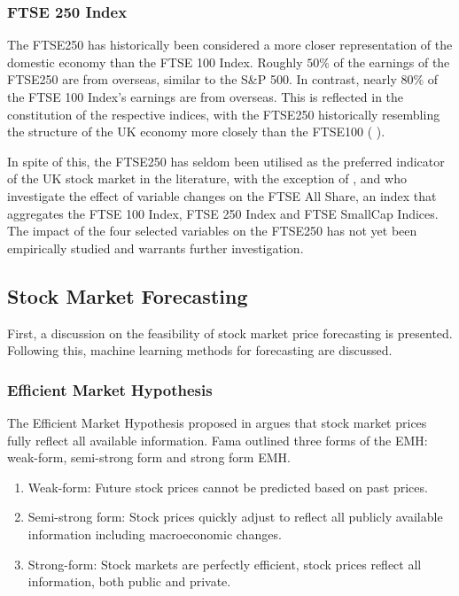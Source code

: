 \documentclass[11pt,a4paper]{article}
\newcommand{\citeboth}[1]{\citeauthor{#1} \citep{#1}}
\begin{document}
\subsubsection{FTSE 250 Index}

The FTSE250 has historically been considered a more closer representation of the domestic economy than the FTSE 100 Index. Roughly $50\%$ of the earnings of the FTSE250 are from overseas, similar to the S\&P 500. In contrast, nearly $80\%$ of the FTSE 100 Index's earnings are from overseas. 
This is reflected in the constitution of the respective indices, with the 
FTSE250 historically resembling the structure of the UK economy more closely than the FTSE100 (\citeboth{ftse250history}).

In spite of this, the FTSE250 has seldom been utilised as the preferred indicator of the UK stock market in the literature,
with the exception of \citeboth{smit2023longrun}, \citeboth{khatri2024impact} and \citeboth{engstrom2006impact} who investigate the effect of variable changes on the FTSE All Share, an index that aggregates the 
FTSE 100 Index, FTSE 250 Index and FTSE SmallCap Indices. The impact of the four selected variables on the FTSE250 has not yet been empirically studied and 
warrants further investigation.

\subsection{Stock Market Forecasting}

First, 
a discussion on the feasibility of stock market price forecasting is presented. Following this, machine learning methods for forecasting are 
discussed.


\subsubsection{Efficient Market Hypothesis}

The Efficient Market Hypothesis proposed in \citeboth{fama1970} argues that stock market prices fully 
reflect all available information. Fama outlined three forms of the EMH:
weak-form, semi-strong form and strong form EMH.
\begin{enumerate}
    \item Weak-form: Future stock prices cannot be predicted based on past prices.
    \item Semi-strong form: Stock prices quickly adjust to reflect all publicly available information including macroeconomic changes.  
    \item Strong-form: Stock markets are perfectly efficient, stock prices reflect all information, both public and private.
\end{enumerate}
\end{document}
